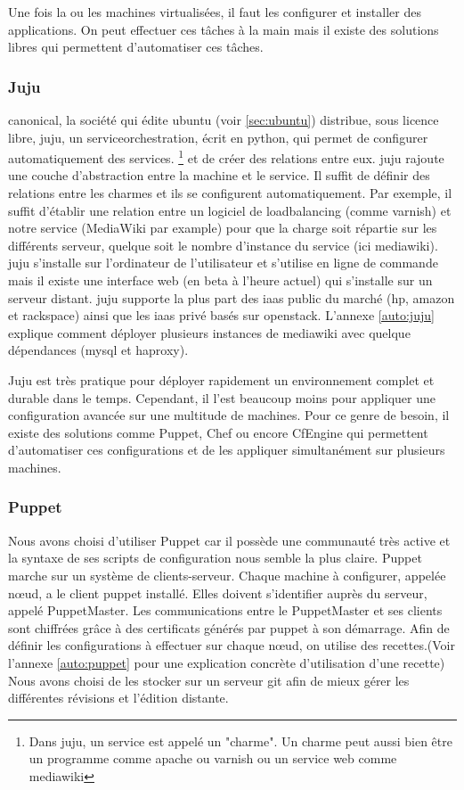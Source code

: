 \documentclass[a4paper,oneside]{report}
\begin{document}
Une fois la ou les machines virtualisées, il faut les configurer et installer des applications. On peut effectuer ces tâches à la main mais il existe des solutions libres qui permettent d'automatiser ces tâches.

\subsubsection{Juju}
\gls{canonical}, la société qui édite \gls{ubuntu} (voir \ref{sec:ubuntu}) distribue, sous licence libre, \gls{juju}, un \gls{serviceorchestration}, écrit en \gls{python}, qui permet de configurer automatiquement des services.
\footnote{Dans \gls{juju}, un service est appelé un "charme". Un charme peut aussi bien être un programme comme \gls{apache} ou \gls{varnish} ou un service web comme \gls{mediawiki}} et de créer des relations entre eux. 
\gls{juju} rajoute une couche d'abstraction entre la machine et le service. Il suffit de définir des relations entre les charmes et ils se configurent automatiquement. 
Par exemple, il suffit d'établir une relation entre un logiciel de \gls{loadbalancing} (comme \gls{varnish}) et notre service (MediaWiki par example) pour que la charge soit répartie sur les différents serveur, quelque soit le nombre d'instance du service (ici \gls{mediawiki}).
\gls{juju} s'installe sur l'ordinateur de l'utilisateur et s'utilise en ligne de commande mais il existe une interface web (en beta à l'heure actuel) qui s'installe sur un serveur distant.
\gls{juju} supporte la plus part des \gls{iaas} public du marché (\gls{hp}, \gls{amazon} et \gls{rackspace}) ainsi que les \gls{iaas} privé basés sur \gls{openstack}.
L'annexe \ref{auto:juju} explique comment déployer plusieurs instances de \gls{mediawiki} avec quelque dépendances (\gls{mysql} et \gls{haproxy}).\newline


Juju est très pratique pour déployer rapidement un environnement complet et durable dans le temps. 
Cependant, il l'est beaucoup moins pour appliquer une configuration avancée sur une multitude de machines.
Pour ce genre de besoin, il existe des solutions comme Puppet, Chef ou encore CfEngine qui permettent d'automatiser ces configurations et de les appliquer simultanément sur plusieurs machines.

\subsubsection{Puppet} 
Nous avons choisi d'utiliser Puppet car il possède une communauté très active et la syntaxe de ses scripts de configuration nous semble la plus claire.
Puppet marche sur un système de clients-serveur.
Chaque machine à configurer, appelée nœud, a le client puppet installé.
Elles doivent s'identifier auprès du serveur, appelé PuppetMaster.
Les communications entre le PuppetMaster et ses clients sont chiffrées grâce à des certificats générés par puppet à son démarrage.
Afin de définir les configurations à effectuer sur chaque nœud, on utilise des recettes.(Voir l'annexe \ref{auto:puppet} pour une explication concrète d'utilisation d'une recette)
Nous avons choisi de les stocker sur un serveur \gls{git} afin de mieux gérer les différentes révisions et l'édition distante.
\end{document}
